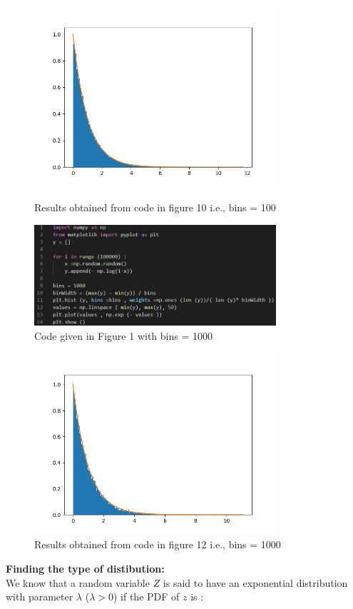 \documentclass[answers]{exam}
\begin{document}
\begin{framed}
\begin{figure}[H] %
    \centering
    \includegraphics[width= 0.8\textwidth]{Q2.1_bins=100.png}
    \caption{Results obtained from code in figure 10 i.e., bins = 100}
    \vspace{1cm}
    \includegraphics[width= 0.8\textwidth]{Q2.1_bins=1000_code.PNG}
    \caption{Code given in Figure 1 with bins = 1000}
\end{figure}

\begin{figure}[H] %
    \centering
    \includegraphics[width= 0.8\textwidth]{Q2.1_bins=1000.png}
    \caption{Results obtained from code in figure 12 i.e., bins = 1000}
\end{figure} 
\textbf{Finding the type of distibution:}\\
We know that a random variable $Z$ is said to have an exponential distribution with parameter $\lambda$ ($\lambda > 0$) if the PDF of $z$ is : \\


\end{framed}
\end{document}
